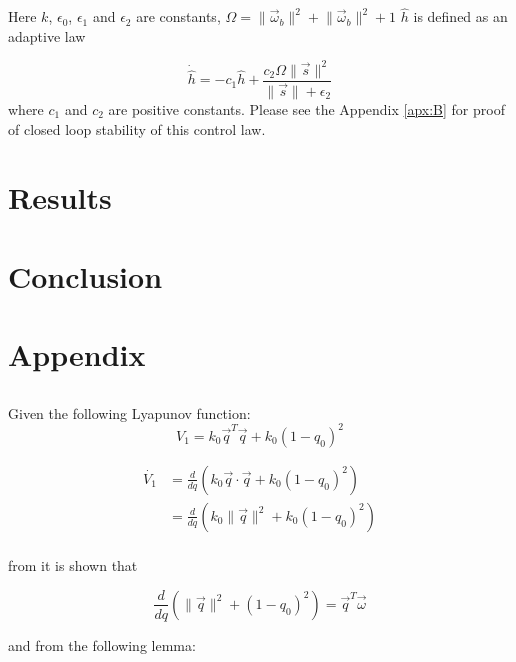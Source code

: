 Here $k$, $\epsilon_0$, $\epsilon_1$ and $\epsilon_2$ are constants, $\Omega = \lVert\vec{\omega}_b\rVert^2 + \lVert\vec{\omega}_b\rVert^2 + 1$ $\hat{h}$ is defined as an adaptive law

\begin{equation}
    \dot{\hat{h}} = -c_1\hat{h} + \frac{c_2\Omega\lVert\vec{s}\rVert^2}{\lVert\vec{s}\rVert+\epsilon_2}
\end{equation}
where $c_1$ and $c_2$ are positive constants.
Please see the Appendix \ref{apx:B} for proof of closed loop stability of this control law. 


\section{Results}

\section{Conclusion}

\section{Appendix}
\subsection{}
Given the following Lyapunov function:
$$
V_{1}=k_{0}\vec{q}^T\vec{q}+k_{0}(1-q_{0})^2
$$

\begin{equation}
    \begin{split}
    \dot{V_{1}}&=\frac{d}{dq}(k_{0}\vec{q}\cdot\vec{q}+k_{0}(1-q_{0})^2) \\
    &=\frac{d}{dq}(k_{0}\lVert\vec{q}\rVert^2+k_{0}(1-q_{0})^2) \\
    \end{split}
\end{equation}

from \cite{kimRobustBacksteppingControl2003} it is shown that

\begin{equation}
    \frac{d}{dq}(\lVert \vec{q} \rVert^{2}+(1-q_{0})^2) = \vec{q}^T \vec{\omega}
\end{equation}

and from the following lemma:

